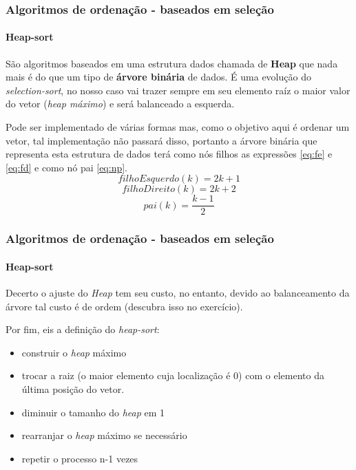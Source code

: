 \begin{frame}
	\frametitle{Algoritmos de ordenação - baseados em seleção}
	\framesubtitle{Heap-sort}
	\par São algoritmos baseados em uma estrutura dados chamada de \textbf{Heap} que nada mais é do que um tipo de \textbf{árvore binária} de dados. É uma evolução do \textit{selection-sort}, no nosso caso vai trazer sempre em seu elemento raíz o maior valor do vetor (\textit{heap máximo}) e será balanceado a esquerda.
	\par Pode ser implementado de várias formas mas, como o objetivo aqui é ordenar um vetor, tal implementação não passará disso, portanto a árvore binária que representa esta estrutura de dados terá como nós filhos as expressões \ref{eq:fe} e \ref{eq:fd} e como nó pai \ref{eq:np}.
	\begin{equation}
		\label{eq:fe}
		filhoEsquerdo(k)=2k+1
	\end{equation}
	\begin{equation}
		\label{eq:fd}
		filhoDireito(k)=2k+2
	\end{equation}
	\begin{equation}
		\label{eq:np}
		pai(k)=\dfrac{k-1}{2}
	\end{equation}
\end{frame}
	
\begin{frame}
	\frametitle{Algoritmos de ordenação - baseados em seleção}
	\framesubtitle{Heap-sort}
	\par Decerto o ajuste do \textit{Heap} tem seu custo, no entanto, devido ao balanceamento da árvore tal custo é de ordem (descubra isso no exercício).
	\par Por fim, eis a definição do \textit{heap-sort}:
	\begin{itemize}
		\item construir o \textit{heap} máximo
		\item trocar a raiz (o maior elemento cuja localização é 0) com o elemento da última posição do vetor.
		\item diminuir o tamanho do \textit{heap} em 1
		\item rearranjar o \textit{heap} máximo se necessário
		\item repetir o processo n-1 vezes
	\end{itemize}
\end{frame}

